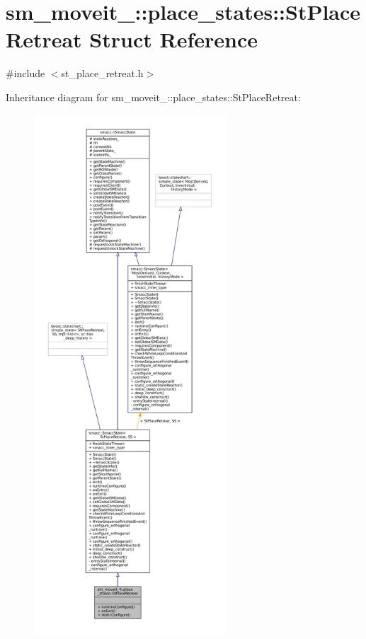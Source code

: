 \hypertarget{structsm__moveit__4_1_1place__states_1_1StPlaceRetreat}{}\section{sm\+\_\+moveit\+\_\+:\+:place\+\_\+states\+:\+:St\+Place\+Retreat Struct Reference}
\label{structsm__moveit__4_1_1place__states_1_1StPlaceRetreat}


{\ttfamily \#include $<$st\+\_\+place\+\_\+retreat.\+h$>$}



Inheritance diagram for sm\+\_\+moveit\+\_\+:\+:place\+\_\+states\+:\+:St\+Place\+Retreat\+:
\nopagebreak
\begin{figure}[H]
\begin{center}
\leavevmode
\includegraphics[height=550pt]{structsm__moveit__4_1_1place__states_1_1StPlaceRetreat__inherit__graph}
\end{center}
\end{figure}


